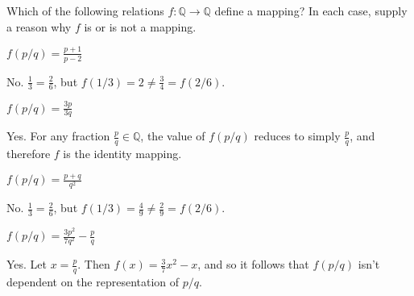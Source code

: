 \section{}\label{sec:1-17}

Which of the following relations $f:\mathbb{Q} \rightarrow \mathbb{Q}$ define a mapping? In each case, supply a reason why $f$ is or is not a mapping.
\hr
\begin{exlist}
    \item $f(p/q) = \frac{p + 1}{p - 2}$

    No. $\frac{1}{3} = \frac{2}{6}$, but $f(1/3) = 2 \neq \frac{3}{4} = f(2/6)$.

    \item $f(p/q) = \frac{3p}{3q}$

    Yes. For any fraction $\frac{p}{q} \in \mathbb{Q}$, the value of $f(p/q)$ reduces to simply $\frac{p}{q}$, and therefore $f$ is the identity mapping.

    \item $f(p/q) = \frac{p + q}{q^2}$

    No. $\frac{1}{3} = \frac{2}{6}$, but $f(1/3) = \frac{4}{9} \neq \frac{2}{9} = f(2/6)$.

    \item $f(p/q) = \frac{3p^2}{7q^2} - \frac{p}{q}$

    Yes. Let $x = \frac{p}{q}$. Then $f(x) = \frac{3}{7}x^2 - x$, and so it follows that $f(p/q)$ isn't dependent on the representation of $p/q$.
\end{exlist}

\section{}\label{sec:1-18}

